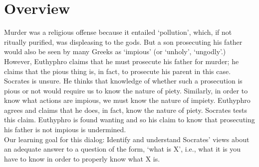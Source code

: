 \documentclass[oneside]{article}
\begin{document}
\section*{Overview}

Murder was a religious offense because it entailed `pollution', which, if not ritually purified, was displeasing to the gods. But a son prosecuting his father would also be seen by many Greeks as `impious' (or `unholy', `ungodly'.) However, Euthyphro claims that he must prosecute his father for murder; he claims that the pious thing is, in fact, to prosecute his parent in this case. Socrates is unsure. He thinks that knowledge of whether such a prosecution is pious or not would require us to know the nature of piety. Similarly, in order to know what actions are impious, we must know the nature of impiety. Euthyphro agrees and claims that he does, in fact, know the nature of piety. Socrates tests this claim. Euthyphro  is found wanting and so his claim to know that prosecuting his father is not impious is undermined.\\ 



\noindent Our learning goal for this dialog:  Identify and understand Socrates' views about an adequate answer to a question of the form, `what is X', i.e., what it is you have to know in order to properly know what X is. 







\end{document}
